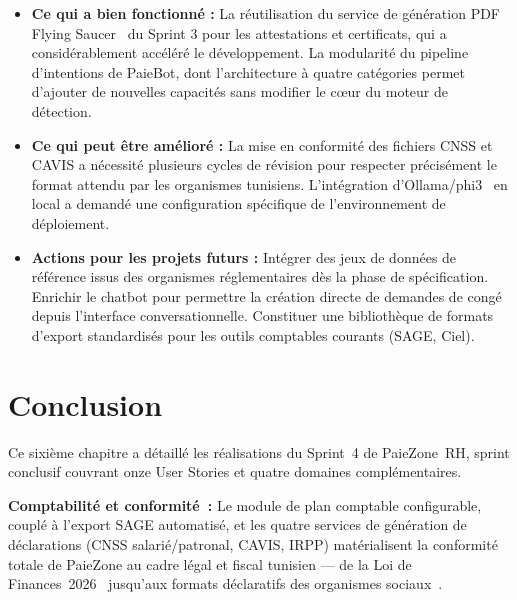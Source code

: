 \begin{itemize}[label=\textbullet, leftmargin=0.6cm]
    \item \textbf{Ce qui a bien fonctionné :} La réutilisation du service
    de génération PDF Flying Saucer~\cite{flyingsaucer} du Sprint 3 pour les attestations
    et certificats, qui a considérablement accéléré le développement.
    La modularité du pipeline d'intentions de PaieBot, dont l'architecture
    à quatre catégories permet d'ajouter de nouvelles capacités sans
    modifier le cœur du moteur de détection.
    \item \textbf{Ce qui peut être amélioré :} La mise en conformité des
    fichiers CNSS et CAVIS a nécessité plusieurs cycles de révision pour
    respecter précisément le format attendu par les organismes tunisiens.
    L'intégration d'Ollama/phi3~\cite{ollama,phi3} en local a demandé une
    configuration spécifique de l'environnement de déploiement.
    \item \textbf{Actions pour les projets futurs :} Intégrer des jeux
    de données de référence issus des organismes réglementaires dès la
    phase de spécification. Enrichir le chatbot pour permettre la création
    directe de demandes de congé depuis l'interface conversationnelle.
    Constituer une bibliothèque de formats d'export standardisés pour les
    outils comptables courants (SAGE, Ciel).
\end{itemize}

\section*{Conclusion}
\label{sec:s4-conclusion}

Ce sixième chapitre a détaillé les réalisations du Sprint~4 de
PaieZone~RH, sprint conclusif couvrant onze User Stories et quatre
domaines complémentaires.

\textbf{Comptabilité et conformité~:} Le module de plan comptable
configurable, couplé à l'export SAGE automatisé, et les quatre
services de génération de déclarations (CNSS salarié/patronal,
CAVIS, IRPP) matérialisent la conformité totale de PaieZone au
cadre légal et fiscal tunisien --- de la Loi de Finances~2026~\cite{lf2026}
jusqu'aux formats déclaratifs des organismes sociaux~\cite{cnss_reg}.

